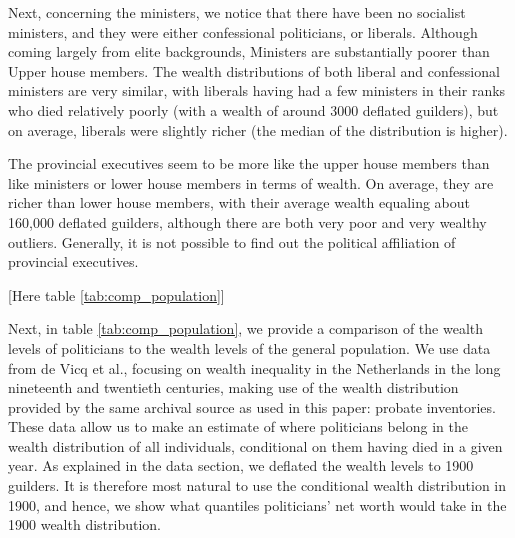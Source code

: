     Next, concerning the ministers, we notice that there have been no socialist ministers, and they were either confessional politicians, or liberals. Although coming largely from elite backgrounds, Ministers are substantially poorer than Upper house members.\autocite{secker1991ministers} The wealth distributions of both liberal and confessional ministers are very similar, with liberals having had a few ministers in their ranks who died relatively poorly (with a wealth of around 3000 deflated guilders), but on average, liberals were slightly richer (the median of the distribution is higher). 
    
    The provincial executives seem to be more like the upper house members than like ministers or lower house members in terms of wealth. On average, they are richer than lower house members, with their average wealth equaling about 160,000 deflated guilders, although there are both very poor and very wealthy outliers. Generally, it is not possible to find out the political affiliation of provincial executives. 
    
    \begin{center}
        [Here table \ref{tab:comp_population}]
    \end{center}
    
    Next, in table \ref{tab:comp_population}, we provide a comparison of the wealth levels of politicians to the wealth levels of the general population. We use data from de Vicq et al., focusing on wealth inequality in the Netherlands in the long nineteenth and twentieth centuries, making use of the wealth distribution provided by the same archival source as used in this paper: probate inventories.\autocite{de2020exploring} These data allow us to make an estimate of where politicians belong in the wealth distribution of all individuals, conditional on them having died in a given year. As explained in the data section, we deflated the wealth levels to 1900 guilders. It is therefore most natural to use the conditional wealth distribution in 1900, and hence, we show what quantiles politicians' net worth would take in the 1900 wealth distribution. 
    
